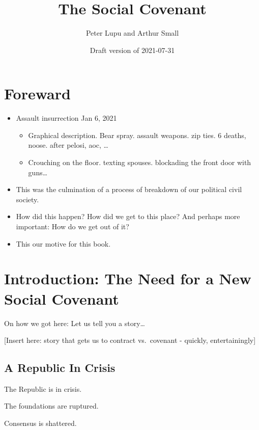 \documentclass[
]{book}
\title{The Social Covenant}
\author{Peter Lupu and Arthur Small}
\date{Draft version of 2021-07-31}
\providecommand{\tightlist}{%
  \setlength{\itemsep}{0pt}\setlength{\parskip}{0pt}}
\begin{document}
\maketitle

{
\setcounter{tocdepth}{1}
\tableofcontents
}
\hypertarget{foreward}{%
\chapter*{Foreward}\label{foreward}}

\begin{itemize}
\item
  Assault insurrection Jan 6, 2021

  \begin{itemize}
  \tightlist
  \item
    Graphical description. Bear spray. assault weapons. zip ties. 6 deaths, noose. after pelosi, aoc, \ldots{}
  \item
    Crouching on the floor. texting spouses. blockading the front door with guns\ldots{}
  \end{itemize}
\item
  This was the culmination of a process of breakdown of our political civil society.
\item
  How did this happen? How did we get to this place? And perhaps more important: How do we get out of it?
\item
  This our motive for this book.
\end{itemize}

\hypertarget{intro}{%
\chapter{Introduction: The Need for a New Social Covenant}\label{intro}}

On how we got here: Let us tell you a story\ldots{}

{[}Insert here: story that gets us to contract vs.~covenant - quickly, entertainingly{]}

\hypertarget{a-republic-in-crisis}{%
\section{A Republic In Crisis}\label{a-republic-in-crisis}}

The Republic is in crisis.

The foundations are ruptured.

Consensus is shattered.
\end{document}
